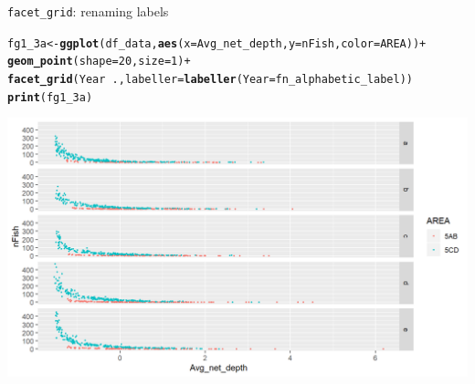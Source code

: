 \documentclass{beamer}\usepackage[]{graphicx}\usepackage[]{color}
\makeatletter
\newcommand{\hlnum}[1]{\textcolor[rgb]{0.686,0.059,0.569}{#1}}%
\newcommand{\hlopt}[1]{\textcolor[rgb]{0,0,0}{#1}}%
\newcommand{\hlstd}[1]{\textcolor[rgb]{0.345,0.345,0.345}{#1}}%
\newcommand{\hlkwb}[1]{\textcolor[rgb]{0.69,0.353,0.396}{#1}}%
\newcommand{\hlkwc}[1]{\textcolor[rgb]{0.333,0.667,0.333}{#1}}%
\newcommand{\hlkwd}[1]{\textcolor[rgb]{0.737,0.353,0.396}{\textbf{#1}}}%
\newenvironment{kframe}{%
 \def\at@end@of@kframe{}%
 \ifinner\ifhmode%
  \def\at@end@of@kframe{\end{minipage}}%
  \begin{minipage}{\columnwidth}%
 \fi\fi%
 \def\FrameCommand##1{\hskip\@totalleftmargin \hskip-\fboxsep
 \colorbox{shadecolor}{##1}\hskip-\fboxsep
     \hskip-\linewidth \hskip-\@totalleftmargin \hskip\columnwidth}%
 \MakeFramed {\advance\hsize-\width
   \@totalleftmargin\z@ \linewidth\hsize
   \@setminipage}}%
 {\par\unskip\endMakeFramed%
 \at@end@of@kframe}
\newenvironment{knitrout}{}{} %
\makeatother
\begin{document}
\begin{frame}[fragile]{\lstinline{facet_grid}: renaming labels}
\begin{knitrout}\footnotesize
{}\color{fgcolor}\begin{kframe}
\begin{alltt}
\hlstd{fg1_3a} \hlkwb{<-} \hlkwd{ggplot}\hlstd{(df_data,} \hlkwd{aes}\hlstd{(}\hlkwc{x}\hlstd{=Avg_net_depth,} \hlkwc{y}\hlstd{=nFish,} \hlkwc{color}\hlstd{=AREA))} \hlopt{+}
  \hlkwd{geom_point}\hlstd{(}\hlkwc{shape}\hlstd{=}\hlnum{20}\hlstd{,} \hlkwc{size}\hlstd{=}\hlnum{1}\hlstd{)} \hlopt{+}
  \hlkwd{facet_grid}\hlstd{(Year} \hlopt{~} \hlstd{.,} \hlkwc{labeller} \hlstd{=} \hlkwd{labeller}\hlstd{(}\hlkwc{Year} \hlstd{= fn_alphabetic_label))}
\hlkwd{print}\hlstd{(fg1_3a)}
\end{alltt}
\end{kframe}

{\centering \includegraphics[width=.9\linewidth]{figure/facet_grid_9-1} 

}



\end{knitrout}
\end{frame}
\end{document}
